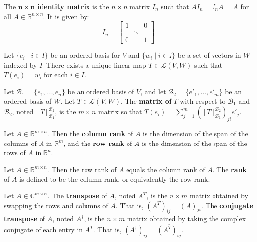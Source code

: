 \documentclass{bareminimum}
\begin{document}
	\begin{defn}
		The \textbf{$\mathbf{n \times n}$ identity matrix}  is the $n \times n$ matrix $I_n$ such that $AI_n = I_nA = A$ for all $A \in 
		\mathbb{R}^{n \times n}$. It is given by:
		\begin{equation}
			I_n = 
			\begin{bmatrix}
				1 & & 0 \\ & \ddots & \\
				0 & & 1
			\end{bmatrix}
		\end{equation}
	\end{defn}
	
	\begin{prop}
		Let $\{e_i \mid i \in I\}$ be an ordered basis for $V$ and $\{w_i \mid i \in I\}$ be a set of vectors in $W$ indexed by $I$. There exists a unique linear map $T \in \mathcal{L}(V,W)$ such that $T(e_i) = w_i$ for each $i \in I$.
	\end{prop}
	
	\begin{defn}
		Let  $\mathcal{B}_1 = \{e_1,\ldots,e_n\}$ be an ordered basis of $V$, and let $\mathcal{B}_2 = \{e'_1,\ldots,e'_m\}$ be an ordered basis of $W$. Let $T \in \mathcal{L}(V,W)$. The \textbf{matrix of} $T$ with respect to $\mathcal{B}_1$ and $\mathcal{B}_2$, noted $[T]_{\mathcal{B}_1}^{\mathcal{B}_2}$, is the $m \times n$ matrix so that $T(e_i) = \sum_{j=1}^m([T]_{\mathcal{B}_1}^{\mathcal{B}_2})_{ji}e'_j$.
	\end{defn}
	
	\begin{defn}
		Let  $A \in \mathbb{R}^{m \times n}$. Then the \textbf{column rank} of $A$ is the dimension of the span of the columns of $A$ in $\mathbb{R}^m$, and the \textbf{row rank} of $A$ is the dimension of the span of the rows of $A$ in $\mathbb{R}^n$.
	\end{defn}
	
	\begin{prop}[Rank]
		Let $A \in \mathbb{R}^{m \times n}$.  Then the row rank of $A$ equals the column rank of $A$. The \textbf{rank} of $A$ is defined to be the column rank, or equivalently the row rank.
	\end{prop}
	
	\begin{defn}
		Let $A \in \mathbb{C}^{m \times n}$.  The \textbf{transpose} of $A$, noted $A^T$, is the $n \times m$ matrix obtained by swapping the rows and columns of $A$. That is, $(A^T)_{ij} = (A)_{ji}$. The \textbf{conjugate transpose} of $A$, noted $A^\dagger$, is the $n \times m$ matrix obtained by taking the complex conjugate of each entry in $A^T$. That is, $(A^\dagger)_{ij} = \overline{(A^T)_{ij}}$.
	\end{defn}
	
\end{document}
